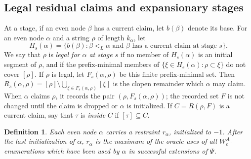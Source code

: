\documentclass[11pt]{amsart}
\newtheorem{definition}[theorem]{Definition}
\begin{document}
\subsection{Legal residual claims and expansionary stages}
At a stage, if an even node $\beta$ has a current claim, let $b(\beta)$ denote
its base.  For an even node $\alpha$ and a string $\rho$ of length
$k_\alpha$, let
\[
   H_s(\alpha)=\{b(\beta):\beta<_L\alpha\text{ and }\beta
          \text{ has a current claim at stage }s\}.
\]
We say that $\rho$ is \emph{legal for $\alpha$ at stage $s$} if no member of
$H_s(\alpha)$ is an initial segment of $\rho$, and if the prefix-minimal
members of $\{\xi\in H_s(\alpha):\rho\subset \xi\}$
do not cover $[\rho]$.  If $\rho$ is legal, let $F_s(\alpha,\rho)$ be this
finite prefix-minimal set.  Then $R_s(\alpha,
\rho)=[\rho]\setminus
       \bigcup_{\xi\in F_s(\alpha,
\rho)}[\xi]$
is the clopen remainder which $\alpha$ may claim.  When $\alpha$ claims
$\rho$, it records the pair $(\rho,F_s(\alpha,
\rho))$; the recorded set $F$ is
not changed until the claim is dropped or $\alpha$ is initialized.
If $C=R(\rho,F)$ is a current claim, say
that $\tau$ is \emph{inside} $C$ if $[\tau]\subseteq C$. 

\begin{definition}
    Each even node $\alpha$ carries a \emph{restraint} $r_\alpha$,
initialized to $-1$.  After the last initialization of $\alpha$,
$r_\alpha$ is the maximum of the oracle uses of all $W_e^A$-enumerations which
have been used by $\alpha$ in successful extensions of $\Psi$.
\end{definition}
\end{document}
